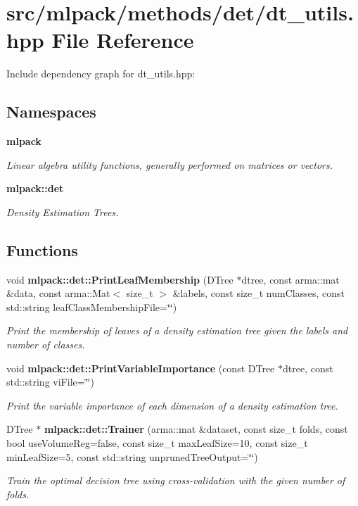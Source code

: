 \section{src/mlpack/methods/det/dt\-\_\-utils.hpp File Reference}
\label{dt__utils_8hpp}
Include dependency graph for dt\-\_\-utils.\-hpp\-:
\subsection*{Namespaces}
\begin{DoxyCompactItemize}
\item 
{\bf mlpack}
\begin{DoxyCompactList}\small\item\em Linear algebra utility functions, generally performed on matrices or vectors. \end{DoxyCompactList}\item 
{\bf mlpack\-::det}
\begin{DoxyCompactList}\small\item\em Density Estimation Trees. \end{DoxyCompactList}\end{DoxyCompactItemize}
\subsection*{Functions}
\begin{DoxyCompactItemize}
\item 
void {\bf mlpack\-::det\-::\-Print\-Leaf\-Membership} (D\-Tree $\ast$dtree, const arma\-::mat \&data, const arma\-::\-Mat$<$ size\-\_\-t $>$ \&labels, const size\-\_\-t num\-Classes, const std\-::string leaf\-Class\-Membership\-File=\char`\"{}\char`\"{})
\begin{DoxyCompactList}\small\item\em Print the membership of leaves of a density estimation tree given the labels and number of classes. \end{DoxyCompactList}\item 
void {\bf mlpack\-::det\-::\-Print\-Variable\-Importance} (const D\-Tree $\ast$dtree, const std\-::string vi\-File=\char`\"{}\char`\"{})
\begin{DoxyCompactList}\small\item\em Print the variable importance of each dimension of a density estimation tree. \end{DoxyCompactList}\item 
D\-Tree $\ast$ {\bf mlpack\-::det\-::\-Trainer} (arma\-::mat \&dataset, const size\-\_\-t folds, const bool use\-Volume\-Reg=false, const size\-\_\-t max\-Leaf\-Size=10, const size\-\_\-t min\-Leaf\-Size=5, const std\-::string unpruned\-Tree\-Output=\char`\"{}\char`\"{})
\begin{DoxyCompactList}\small\item\em Train the optimal decision tree using cross-\/validation with the given number of folds. \end{DoxyCompactList}\end{DoxyCompactItemize}


